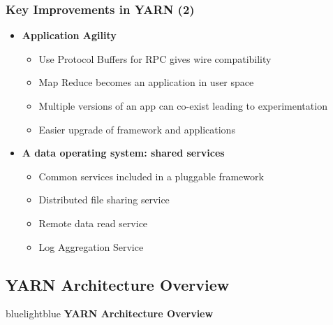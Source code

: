 \begin{frame}
\frametitle{Key Improvements in YARN (2)}
\begin{itemize}
  \item {\bf Application Agility}
  \begin{itemize}
    \item Use Protocol Buffers for RPC gives wire compatibility
    \item Map Reduce becomes an application in user space
    \item Multiple versions of an app can co-exist leading to experimentation
    \item Easier upgrade of framework and applications
  \end{itemize}

\vspace{20pt}

  \item {\bf A data operating system: shared services}
  \begin{itemize}
    \item Common services included in a pluggable framework
    \item Distributed file sharing service
    \item Remote data read service
    \item Log Aggregation Service
  \end{itemize}
\end{itemize}
\end{frame}

\subsection{YARN Architecture Overview}
\begin{frame}
 \begin{colorblock}{blue}{lightblue}{ }
    \Large \textbf{YARN Architecture Overview}
  \end{colorblock}
\end{frame}

